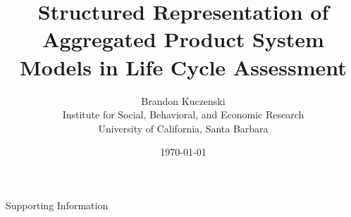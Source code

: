 \documentclass[12pt]{article}
\title{Structured Representation of Aggregated Product System Models in Life Cycle Assessment}
\author{Brandon Kuczenski\\
Institute for Social, Behavioral, and Economic Research\\
University of California, Santa Barbara}
\date{\mydate\today}
\def\mainpaper{

  \maketitle

  

  \doublespacing

  
  
  
  
  
  
  

  

  
  
  
  
  

  

  \singlespacing
  
}
\def\supporting{
  \renewcommand{\thefigure}{S\arabic{figure}}
  \renewcommand{\thetable}{S\arabic{table}}

  \maketitle

  \begin{center}
    \Large Supporting Information
  \end{center}

  \doublespacing

  

  
  
  
  
  

  \singlespacing
}
\def\unused{
  
}
\begin{document}
\supporting

\end{document}
